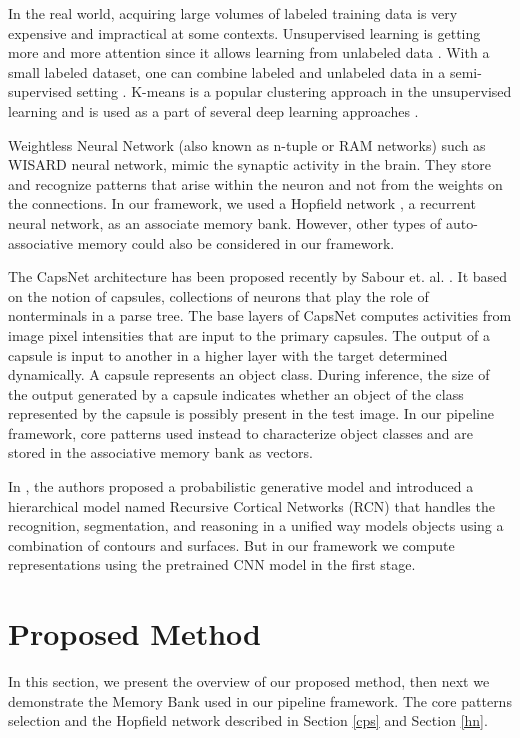 \documentclass[conference]{IEEEtran}
\begin{document}
  In the real world, acquiring large volumes of  labeled  training data is very expensive and impractical at some contexts. Unsupervised learning is getting more and more  attention  since it  allows learning from unlabeled data \cite{masci2011stacked}. With a small labeled dataset, one can combine  labeled and unlabeled data in a semi-supervised  setting \cite{kingma2014semi}.  K-means is a popular clustering approach in  the unsupervised learning and is used as a part of  several deep  learning approaches \cite{gong2014compressing,ke2016fast,wang2015semantic}.\par

  Weightless Neural Network (also known as n-tuple or RAM networks) such as WISARD neural network\cite{aleksander1984wisard}, mimic the synaptic  activity in the brain. They store and recognize patterns that arise within the neuron  and not from the weights  on the connections. 
In our  framework, we used a Hopfield network \cite{hopfield1984neurons}, a  recurrent neural network, as an associate memory bank. However, other types of auto-associative memory could also be considered in our framework.\par

The CapsNet architecture has been proposed recently by Sabour et. al. \cite{sabour2017dynamic}. It based on the notion of capsules, collections of neurons that play the role of nonterminals in a parse tree. The base layers of CapsNet computes activities from image pixel intensities that are input to the primary capsules. The output of a capsule is input to another in a higher layer with the target determined dynamically. A capsule represents an object class. During inference, the size of the output generated by a capsule indicates whether an object of the class represented by the capsule is possibly present in the test image. In our pipeline framework, core patterns used instead to characterize object classes and are stored in the associative memory bank as vectors.\par
In \cite{george2017generative}, the authors proposed  a probabilistic generative model   and  introduced a hierarchical model named Recursive Cortical Networks (RCN) that  handles the recognition, segmentation, and reasoning in a unified way  models objects using a combination of contours and surfaces. But in our  framework we  compute representations  using the pretrained CNN model in the first stage.

\section{Proposed Method}\label{pm}
In this section, we present the overview of our proposed method, then next we demonstrate the Memory Bank used in our pipeline framework. The core patterns selection and the Hopfield network described in Section \ref{cps} and Section \ref{hn}.
\end{document}

